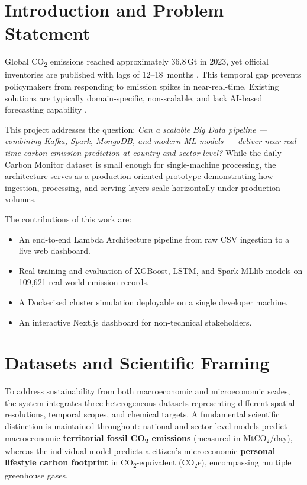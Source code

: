 \documentclass[conference]{IEEEtran}
\begin{document}
\section{Introduction and Problem Statement}

Global CO\textsubscript{2} emissions reached approximately 36.8\,Gt in 2023,
yet official inventories are published with lags of 12--18~months
\cite{carbonmonitor2020}.
This temporal gap prevents policymakers from responding to emission spikes in
near-real-time.
Existing solutions are typically domain-specific, non-scalable, and lack
AI-based forecasting capability \cite{edgar2021}.

This project addresses the question:
\textit{Can a scalable Big Data pipeline --- combining Kafka, Spark, MongoDB,
and modern ML models --- deliver near-real-time carbon emission prediction at
country and sector level?}
While the daily Carbon Monitor dataset is small enough for single-machine processing, the architecture serves as a production-oriented prototype demonstrating how ingestion, processing, and serving layers scale horizontally under production volumes.

The contributions of this work are:
\begin{itemize}
    \item An end-to-end Lambda Architecture pipeline from raw CSV ingestion
          to a live web dashboard.
    \item Real training and evaluation of XGBoost, LSTM, and Spark MLlib
          models on 109{,}621 real-world emission records.
    \item A Dockerised cluster simulation deployable on a single developer
          machine.
    \item An interactive Next.js dashboard for non-technical stakeholders.
\end{itemize}

\section{Datasets and Scientific Framing}

To address sustainability from both macroeconomic and microeconomic scales, the system integrates three heterogeneous datasets representing different spatial resolutions, temporal scopes, and chemical targets. A fundamental scientific distinction is maintained throughout: national and sector-level models predict macroeconomic \textbf{territorial fossil CO\textsubscript{2} emissions} (measured in $\text{MtCO}_2/\text{day}$), whereas the individual model predicts a citizen's microeconomic \textbf{personal lifestyle carbon footprint} in CO\textsubscript{2}-equivalent ($\text{CO}_2\text{e}$), encompassing multiple greenhouse gases.
\end{document}
